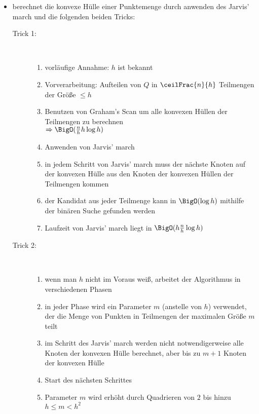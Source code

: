 \begin{itemize}
	\item berechnet die konvexe Hülle einer Punktemenge durch anwenden des Jarvis' march und die folgenden beiden Tricks:
		\begin{description}
			\item[Trick 1:]\ \\\vspace*{-1.5\baselineskip}
				\begin{enumerate}[itemsep=0pt]
					\item vorläufige Annahme: $h$ ist bekannt
					\item Vorverarbeitung: Aufteilen von $Q$ in $\ceilFrac{n}{h}$ Teilmengen der Größe $\leq h$
					\item Benutzen von Graham's Scan um alle konvexen Hüllen der Teilmengen zu berechnen\\
					$\Rightarrow \BigO(\frac{n}{h}h\log h)$
					\item Anwenden von Jarvis' march
					\item in jedem Schritt von Jarvis' march muss der nächste Knoten auf der konvexen Hülle aus den Knoten der konvexen Hüllen der Teilmengen kommen
					\item der Kandidat aus jeder Teilmenge kann in $\BigO(\log h)$ mithilfe der binären Suche gefunden werden
					\item Laufzeit von Jarvis' march liegt in $\BigO(h\frac{n}{h}\log h)$
				\end{enumerate}
			\item[Trick 2:] \ \\\vspace*{-1.5\baselineskip}
				\begin{enumerate}
					\item wenn man $h$ nicht im Voraus weiß, arbeitet der Algorithmus in verschiedenen Phasen
					\item in jeder Phase wird ein Parameter $m$ (anstelle von $h$) verwendet, der die Menge von Punkten in Teilmengen der maximalen Größe $m$ teilt
					\item im Schritt des Jarvis' march werden nicht notwendigerweise alle Knoten der konvexen Hülle berechnet, aber bis zu $m+1$ Knoten der konvexen Hülle
					\item Start des nächsten Schrittes
					\item Parameter $m$ wird erhöht durch Quadrieren von $2$ bis hinzu $h\leq m<h^2$
				\end{enumerate}
		\end{description}

\end{itemize}
